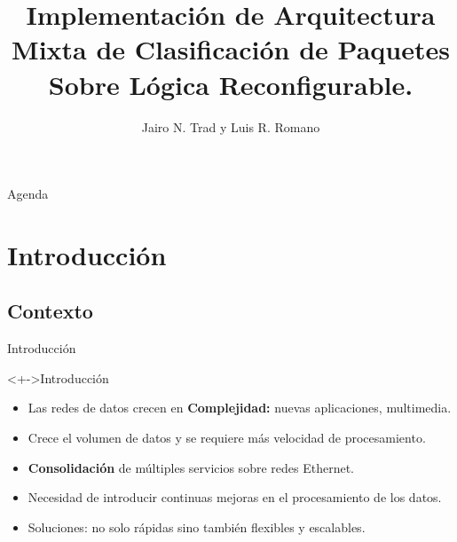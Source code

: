 \documentclass[xcolor=dvipsnames]{beamer}
\title[] {Implementación de Arquitectura Mixta de Clasificación de Paquetes Sobre Lógica Reconfigurable.}
\author[] {Jairo N. Trad y Luis R. Romano}
\institute[Universidades] %
{
  \scriptsize Laboratorio de Comunicaciones Digitales \\
  \scriptsize Universidad Nacional de Córdoba, Facultad Ciencias Exactas, Físicas y Naturales \\ 
}
\begin{document}
\begin{frame}
  \titlepage
\end{frame}

\begin{frame}{Agenda}
  \tiny 
  \tableofcontents
\end{frame}

\scriptsize

\section{Introducción}

\subsection{Contexto}

\begin{frame}{Introducción}
  \scriptsize
  
  \begin{block}<+->{Introducción}

    \begin{itemize}
      \item Las redes de datos crecen en {\bf Complejidad:} nuevas aplicaciones, multimedia.
      \item Crece el volumen de datos y se requiere más velocidad de procesamiento.
      \item {\bf Consolidación} de múltiples servicios sobre redes Ethernet.     
      \item Necesidad de introducir continuas mejoras en el procesamiento de los datos.
      \item Soluciones: no solo rápidas sino también flexibles y escalables.
    \end{itemize}
    
  \end{block}
    

\end{frame}
\end{document}
